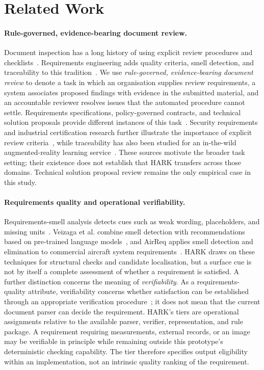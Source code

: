 \documentclass[computers,article,submit,moreauthors]{Definitions/mdpi}
\begin{document}
\section{Related Work}

\paragraph{Rule-governed, evidence-bearing document review.}
Document inspection has a long history of using explicit review procedures and checklists~\cite{fagan1976,lait2000}. Requirements engineering adds quality criteria, smell detection, and traceability to this tradition~\cite{iso29148,genova2013,femmer2017}. We use \emph{rule-governed, evidence-bearing document review} to denote a task in which an organisation supplies review requirements, a system associates proposed findings with evidence in the submitted material, and an accountable reviewer resolves issues that the automated procedure cannot settle. Requirements specifications, policy-governed contracts, and technical solution proposals provide different instances of this task~\cite{chinnam2025,alsawalqah2026,malik2026}. Security requirements and industrial certification research further illustrate the importance of explicit review criteria~\cite{secreq2025,cyberreq2026}, while traceability has also been studied for an in-the-wild augmented-reality learning service~\cite{trace2026}. These sources motivate the broader task setting; their existence does not establish that HARK transfers across those domains. Technical solution proposal review remains the only empirical case in this study.

\paragraph{Requirements quality and operational verifiability.}
Requirements-smell analysis detects cues such as weak wording, placeholders, and missing units~\cite{femmer2017}. Veizaga et al. combine smell detection with recommendations based on pre-trained language models~\cite{smell2024}, and AirReq applies smell detection and elimination to commercial aircraft system requirements~\cite{airreq2025}. HARK draws on these techniques for structural checks and candidate localisation, but a surface cue is not by itself a complete assessment of whether a requirement is satisfied. A further distinction concerns the meaning of \emph{verifiability}. As a requirements-quality attribute, verifiability concerns whether satisfaction can be established through an appropriate verification procedure~\cite{iso29148,genova2013}; it does not mean that the current document parser can decide the requirement. HARK's tiers are operational assignments relative to the available parser, verifier, representation, and rule package. A requirement requiring measurements, external records, or an image may be verifiable in principle while remaining outside this prototype's deterministic checking capability. The tier therefore specifies output eligibility within an implementation, not an intrinsic quality ranking of the requirement.
\end{document}
